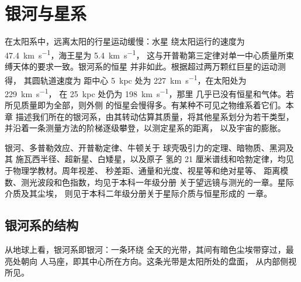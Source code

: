 \chapter{银河与星系}\label{ch:b3:milky-way-galaxies}

在太阳系中，远离太阳的行星运动缓慢：水星
绕太阳运行的速度为 \qty{47.4}{km.s^{-1}}，海王星为 \qty{5.4}{km.s^{-1}}，
这与开普勒第三定律对单一中心质量所束缚天体的要求一致。银河系的恒星
并非如此。根据超过两万颗红巨星的运动测得，
其圆轨道速度为
距中心 \qty{5}{kpc} 处为 \qty{227}{km.s^{-1}}，在太阳处为 \qty{229}{km.s^{-1}}，
在 \qty{25}{kpc} 处仍为 \qty{198}{km.s^{-1}}，那里
几乎已没有恒星和气体。若所见质量即为全部，则外侧
的恒星会慢得多。有某种不可见之物维系着它们。本章
描述我们所在的银河系，由其转动估算其质量，将其他星系划分为若干类型，
并沿着一条测量方法的阶梯逐级攀登，以测定星系的距离，
以及宇宙的膨胀。

\begin{recall}
银河、多普勒效应、开普勒定律、牛顿关于
球壳吸引力的定理、暗物质、黑洞及其
施瓦西半径、超新星、白矮星，以及原子
氢的 21 厘米谱线和哈勃定律，均见于物理学教材。周年视差、
秒差距、通量和光度、视星等和绝对星等、
距离模数、测光波段和色指数，均见于本科一年级分册
关于望远镜与测光的一章。星际介质及其尘埃，
则见于本科二年级分册关于星际介质与恒星形成的
一章。
\end{recall}

\section{银河系的结构}\label{sec:b3:milky-way-galaxies:structure}

从地球上看，银河系即银河：一条环绕
全天的光带，其间有暗色尘埃带穿过，最亮处朝向
人马座，即其中心所在方向。这条光带是太阳所处的盘面，
从内部侧视所见。

